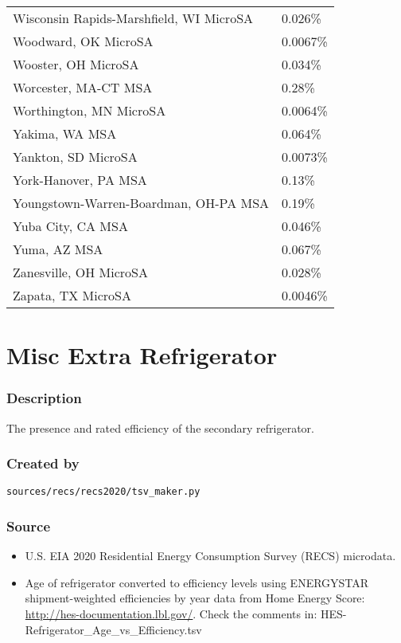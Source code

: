 \begin{longtable}[]{@{}ll@{}}
Wisconsin Rapids-Marshfield, WI MicroSA & 0.026\% \\
Woodward, OK MicroSA & 0.0067\% \\
Wooster, OH MicroSA & 0.034\% \\
Worcester, MA-CT MSA & 0.28\% \\
Worthington, MN MicroSA & 0.0064\% \\
Yakima, WA MSA & 0.064\% \\
Yankton, SD MicroSA & 0.0073\% \\
York-Hanover, PA MSA & 0.13\% \\
Youngstown-Warren-Boardman, OH-PA MSA & 0.19\% \\
Yuba City, CA MSA & 0.046\% \\
Yuma, AZ MSA & 0.067\% \\
Zanesville, OH MicroSA & 0.028\% \\
Zapata, TX MicroSA & 0.0046\% \\
\end{longtable}

\section{Misc Extra Refrigerator}\label{misc_extra_refrigerator}

\subsubsection{Description}\label{description-110}

The presence and rated efficiency of the secondary refrigerator.

\subsubsection{Created by}\label{created-by-111}

\texttt{sources/recs/recs2020/tsv\_maker.py}

\subsubsection{Source}\label{source-113}

\begin{itemize}
 
\item
  U.S. EIA 2020 Residential Energy Consumption Survey (RECS) microdata.
\item
  Age of refrigerator converted to efficiency levels using ENERGYSTAR
  shipment-weighted efficiencies by year data from Home Energy Score:
  \url{http://hes-documentation.lbl.gov/}. Check the comments in:
  HES-Refrigerator\_Age\_vs\_Efficiency.tsv
\end{itemize}

